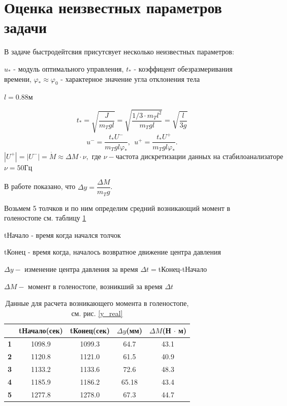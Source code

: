 \documentclass[a4paper,12pt, openany]{book}
\theoremstyle{plain} %
\theoremstyle{definition} %
\theoremstyle{remark} %
\numberwithin{equation}{chapter}
\begin{document}
{\section{Оценка неизвестных параметров задачи}

В задаче быстродейтсвия присутсвует несколько неизвестных параметров:

$u_*$ - модуль оптимального управления,
$t_*$ - коэффицент обезразмеривания времени,
$\varphi_*\approx\varphi_0$ - характерное значение угла отклонения тела


$l=0.88$м

$$t_\ast=\sqrt{\frac{J}{m_Tgl}}=\sqrt{\frac{1/3 \cdot m_T l^2}{m_Tgl}}=\sqrt{\frac{l}{3g}}$$
\[
    u^-=\frac{t_\ast U^-}{m_Tgl\varphi_\ast },\ \ u^+=\frac{t_\ast U^+}{m_Tgl\varphi_\ast}.
\]
$|U^+|=|U^-|=\dot M\approx \Delta M \cdot \nu, \text{ где } \nu - \text{частота дискретизации данных на стабилоанализаторе } $
$\nu =50\text{Гц}$

В работе \cite{kruchinMetoda} показано, что $\Delta y=\dfrac{\Delta M}{m_Tg}$.

Возьмем 5 толчков и по ним определим средний возникающий момент в голеностопе см. таблицу \ref*{moments_calculating}

tНачало - время когда начался толчок

tКонец - время когда, началось возвратное движение центра давления

$\Delta y - $ изменение центра давления за время $\Delta t = $tКонец-tНачало

$\Delta M - $ момент в голеностопе, возникший за время $\Delta t$
\begin{table}[h!]
    \centering
    \begin{tabular}{|l|c|c|c|c|}
        \hline
        \textbf{}                                    &
        \multicolumn{1}{l|}{\textbf{tНачало(сек)}}    &
        \multicolumn{1}{l|}{\textbf{tКонец(сек)}}      &
        \multicolumn{1}{l|}{\textbf{$\Delta y$(мм)}} &
        \multicolumn{1}{l|}{\textbf{$\Delta M $(Н $\cdot$ м)}}                        \\ \hline
        \textbf{1}                                   & 1098.9 & 1099.3 & 64.7  & 43.1 \\ \hline
        \textbf{2}                                   & 1120.8 & 1121.0 & 61.5  & 40.9 \\ \hline
        \textbf{3}                                   & 1133.2 & 1133.6 & 72.6  & 48.3 \\ \hline
        \textbf{4}                                   & 1185.9 & 1186.2 & 65.18 & 43.4 \\ \hline
        \textbf{5}                                   & 1277.8 & 1278.0 & 67.3  & 44.7 \\ \hline
    \end{tabular}
    \caption{Данные для расчета возникающего момента в голеностопе, см. рис. \ref{y_real} }
    \label{moments_calculating}
\end{table}

}
\end{document}
